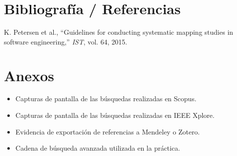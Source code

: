 \documentclass[11pt,a4paper]{article}
\begin{document}
\section{Bibliografía / Referencias}
K. Petersen et al., ``Guidelines for conducting systematic mapping studies in software engineering,'' \textit{IST}, vol. 64, 2015.

\section{Anexos}
\begin{itemize}[leftmargin=1.2cm]
    \item Capturas de pantalla de las búsquedas realizadas en Scopus.
    \item Capturas de pantalla de las búsquedas realizadas en IEEE Xplore.
    \item Evidencia de exportación de referencias a Mendeley o Zotero.
    \item Cadena de búsqueda avanzada utilizada en la práctica.
\end{itemize}
\end{document}
